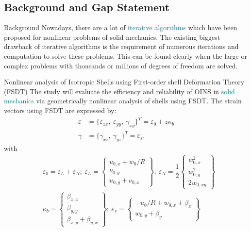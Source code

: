 \documentclass[
10pt,
aspectratio=169,
]{beamer}
\begin{document}
\subsection{Background and Gap Statement}
\begin{frame}[c]{Background} 
    Nowadays, there are a lot of \textcolor{teal}{iterative algorithms} which have been proposed for nonlinear problems of solid mechanics. The existing biggest drawback of iterative algorithms is the requirement of numerous iterations and computation to solve these problems. This can be found clearly when the large or complex problems with thousands or millions of degrees of freedom are solved.
\end{frame}
\begin{frame}{Nonlinear analysis of Isotropic Shells using First-order shell Deformation Theory (FSDT)}
    The study will evaluate the efficiency and reliability of OINS in \textcolor{teal}{solid mechanics} via geometrically nonlinear analysis of shells using FSDT. The strain vectors using FSDT are expressed by:
    \begin{align*}
        \varepsilon &= \{\varepsilon_{xx},\: \varepsilon_{yy},\: \gamma_{xy}\}^T = \varepsilon_0 + z\kappa_b \\
        \gamma &= \{\gamma_{xz},\: \gamma_{yz}\}^T = \varepsilon_s,
    \end{align*} \pause
    with
    \begin{align*}
        &\varepsilon_0 = \varepsilon_L + \varepsilon_N;\:\varepsilon_L = \left\{
        \begin{matrix}
            u_{0,x}+w_0/R \\
            \nu_{0,y} \\
            u_{0,y}+\nu_{0,x}
        \end{matrix}
        \right\}; \: \varepsilon_N = \dfrac{1}{2}\left\{
        \begin{matrix}
            w_{0,x}^2 \\
            w_{0,y}^2 \\
            2w_{0,xy}
        \end{matrix}
        \right\} \\
        &\kappa_b = \left\{
        \begin{matrix}
            \beta_{x,x} \\
            \beta_{y,y} \\
            \beta_{x,y} + \beta_{y,x}
        \end{matrix}
        \right\};\: \varepsilon_s = \left\{
        \begin{matrix}
            -u_0/R + w_{0,x} + \beta_x \\ 
            w_{0,y} + \beta_y
         \end{matrix}
        \right\}
    \end{align*}
\end{frame}
\end{document}
